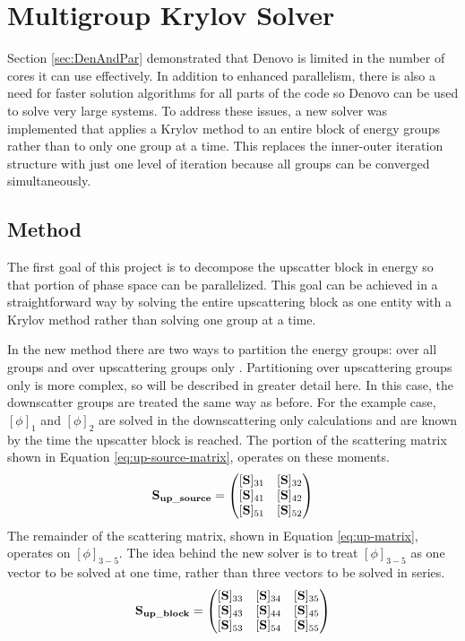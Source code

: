 \section{Multigroup Krylov Solver}
Section \ref{sec:DenAndPar} demonstrated that Denovo is limited in the number of cores it can use effectively. In addition to enhanced parallelism, there is also a need for faster solution algorithms for all parts of the code so Denovo can be used to solve very large systems. To address these issues, a new solver was implemented that applies a Krylov method to an entire block of energy groups rather than to only one group at a time. This replaces the inner-outer iteration structure with just one level of iteration because all groups can be converged simultaneously. 

\subsection{Method}
\label{subsec:KrylovMethod}
The first goal of this project is to decompose the upscatter block in energy so that portion of phase space can be parallelized. This goal can be achieved in a straightforward way by solving the entire upscattering block as one entity with a Krylov method rather than solving one group at a time. 

In the new method there are two ways to partition the energy groups: over all groups and over upscattering groups only \cite{Evans2010}. Partitioning over upscattering groups only is more complex, so will be described in greater detail here. In this case, the downscatter groups are treated the same way as before. For the example case, $[\phi]_{1}$ and $[\phi]_{2}$ are solved in the downscattering only calculations and are known by the time the upscatter block is reached. The portion of the scattering matrix shown in Equation \eqref{eq:up-source-matrix}, operates on these moments. 
%
 \begin{equation}
  \mathbf{S_{up\_source}}  =     \begin{pmatrix}
      [\ve{S}]_{31} & [\ve{S}]_{32}  \\
      [\ve{S}]_{41} & [\ve{S}]_{42}  \\
      [\ve{S}]_{51} & [\ve{S}]_{52} 
    \end{pmatrix} 
    \label{eq:up-source-matrix} 
 \end{equation}
%
The remainder of the scattering matrix, shown in Equation \eqref{eq:up-matrix}, operates on $[\phi]_{3-5}$. The idea behind the new solver is to treat $[\phi]_{3-5}$ as one vector to be solved at one time, rather than three vectors to be solved in series. 
%
 \begin{equation}
  \mathbf{S_{up\_block}}  =     \begin{pmatrix}
      [\ve{S}]_{33} & [\ve{S}]_{34} & [\ve{S}]_{35} \\
      [\ve{S}]_{43} & [\ve{S}]_{44} & [\ve{S}]_{45} \\
      [\ve{S}]_{53} & [\ve{S}]_{54} & [\ve{S}]_{55}
    \end{pmatrix} 
    \label{eq:up-matrix}
\end{equation}

